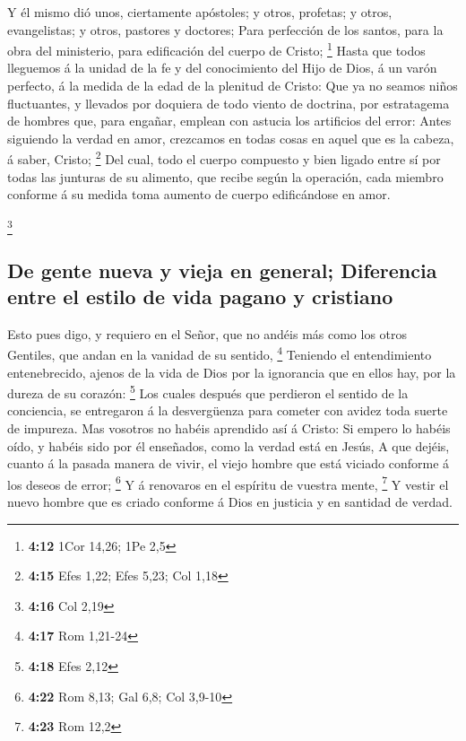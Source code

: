  Y él mismo dió unos, ciertamente apóstoles; y otros,
profetas; y otros, evangelistas; y otros, pastores y doctores;
 Para perfección de los santos, para la obra del
ministerio, para edificación del cuerpo de Cristo; \footnote{\textbf{4:12}
  1Cor 14,26; 1Pe 2,5}  Hasta que todos lleguemos á la
unidad de la fe y del conocimiento del Hijo de Dios, á un varón
perfecto, á la medida de la edad de la plenitud de Cristo: 
Que ya no seamos niños fluctuantes, y llevados por doquiera de todo
viento de doctrina, por estratagema de hombres que, para engañar,
emplean con astucia los artificios del error:  Antes
siguiendo la verdad en amor, crezcamos en todas cosas en aquel que es la
cabeza, á saber, Cristo; \footnote{\textbf{4:15} Efes 1,22; Efes 5,23;
  Col 1,18}  Del cual, todo el cuerpo compuesto y bien
ligado entre sí por todas las junturas de su alimento, que recibe según
la operación, cada miembro conforme á su medida toma aumento de cuerpo
edificándose en amor.

\footnote{\textbf{4:16} Col 2,19}

\hypertarget{de-gente-nueva-y-vieja-en-general-diferencia-entre-el-estilo-de-vida-pagano-y-cristiano}{%
\subsection{De gente nueva y vieja en general; Diferencia entre el
estilo de vida pagano y
cristiano}\label{de-gente-nueva-y-vieja-en-general-diferencia-entre-el-estilo-de-vida-pagano-y-cristiano}}

 Esto pues digo, y requiero en el Señor, que no andéis más
como los otros Gentiles, que andan en la vanidad de su sentido,
\footnote{\textbf{4:17} Rom 1,21-24}  Teniendo el
entendimiento entenebrecido, ajenos de la vida de Dios por la ignorancia
que en ellos hay, por la dureza de su corazón: \footnote{\textbf{4:18}
  Efes 2,12}  Los cuales después que perdieron el sentido
de la conciencia, se entregaron á la desvergüenza para cometer con
avidez toda suerte de impureza.  Mas vosotros no habéis
aprendido así á Cristo:  Si empero lo habéis oído, y habéis
sido por él enseñados, como la verdad está en Jesús,  A que
dejéis, cuanto á la pasada manera de vivir, el viejo hombre que está
viciado conforme á los deseos de error; \footnote{\textbf{4:22} Rom
  8,13; Gal 6,8; Col 3,9-10}  Y á renovaros en el espíritu
de vuestra mente, \footnote{\textbf{4:23} Rom 12,2}  Y
vestir el nuevo hombre que es criado conforme á Dios en justicia y en
santidad de verdad.

